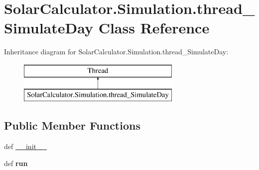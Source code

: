 \hypertarget{class_solar_calculator_1_1_simulation_1_1thread___simulate_day}{\section{Solar\-Calculator.\-Simulation.\-thread\-\_\-\-Simulate\-Day Class Reference}
\label{class_solar_calculator_1_1_simulation_1_1thread___simulate_day}
}
Inheritance diagram for Solar\-Calculator.\-Simulation.\-thread\-\_\-\-Simulate\-Day\-:\begin{figure}[H]
\begin{center}
\leavevmode
\includegraphics[height=2.000000cm]{class_solar_calculator_1_1_simulation_1_1thread___simulate_day}
\end{center}
\end{figure}
\subsection*{Public Member Functions}
\begin{DoxyCompactItemize}
\item 
def \hyperlink{class_solar_calculator_1_1_simulation_1_1thread___simulate_day_a4501df183c3ff24b0e4e0409512fac28}{\-\_\-\-\_\-init\-\_\-\-\_\-}
\item 
\hypertarget{class_solar_calculator_1_1_simulation_1_1thread___simulate_day_a910a4318a4c54c3935927c0d6972850a}{def {\bfseries run}}\label{class_solar_calculator_1_1_simulation_1_1thread___simulate_day_a910a4318a4c54c3935927c0d6972850a}

\end{DoxyCompactItemize}
